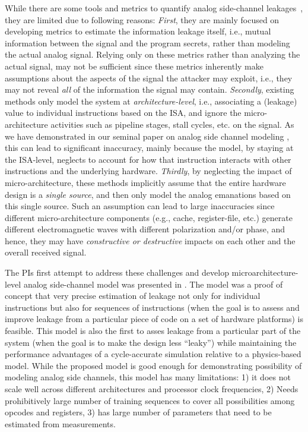\documentclass[11 pt]{article}
\begin{document}
While there are some tools and metrics to quantify analog side-channel leakages~\cite{Demme:2013:FOM:2485922.2485970,Callan:2014:PMM:2742155.2742179,McCann:2017:TPT:3241189.3241207,Barenghi:2018:SSS:3195970.3196112, yilmaz17tifs}, they are limited due to following reasons: \textit{First}, they are mainly focused on developing metrics to estimate the information leakage itself, i.e., mutual information between the signal and the program secrets, rather than modeling the actual analog signal. Relying only on these metrics rather than analyzing the actual signal, may not be sufficient since these metrics inherently make assumptions about the aspects of the signal the attacker may exploit, i.e., they may not reveal \emph{all} of the information the signal may contain. \textit{Secondly}, existing methods only model the system at \textit{architecture-level}, i.e., associating a (leakage) value to individual instructions based on the ISA, and ignore the micro-architecture activities such as pipeline stages, stall cycles, etc. on the signal. As we have demonstrated in our seminal paper on analog side channel modeling \cite{Nader2020}, this can lead to significant inaccuracy, mainly because the model, by staying at the ISA-level, neglects to account for how that instruction interacts with other instructions and the underlying hardware.  \textit{Thirdly}, by neglecting the impact of micro-architecture, these methods implicitly assume that the entire hardware design is a \textit{single source}, and then only model the analog emanations based on this single source. Such an assumption can lead to large inaccuracies since different micro-architecture components (e.g., cache, register-file, etc.) generate different electromagnetic waves with different polarization and/or phase, and hence, they may have \emph{constructive or destructive} impacts on each other and the overall received signal.

The PIs first attempt to address these challenges and develop microarchitecture-level analog side-channel model was presented in \cite{Nader2020}. The model was a proof of concept that very precise estimation of leakage not only for individual instructions but also for sequences of instructions (when the goal is to assess and improve leakage from a particular piece of code on a set of hardware platforms) is feasible. This model is also the first to asses leakage from a particular part of the system (when the goal is to make the design less ``leaky'') while maintaining the performance advantages of a cycle-accurate simulation relative to a physics-based model. While the proposed model is good enough for demonstrating possibility of modeling analog side channels, this model has many limitations: 1) it does not scale well across different architectures and processor clock frequencies, 2) Needs prohibitively large number of training sequences to cover all possibilities among opcodes and registers, 3) has large number of parameters that need to be estimated from measurements.
\end{document}
